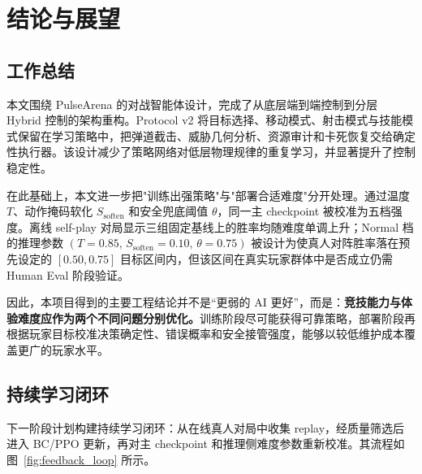 \documentclass[UTF8,a4paper,11pt]{ctexart}
\begin{document}
\section{结论与展望}

\subsection{工作总结}
本文围绕 PulseArena 的对战智能体设计，完成了从底层端到端控制到分层 Hybrid 控制的架构重构。Protocol v2 将目标选择、移动模式、射击模式与技能模式保留在学习策略中，把弹道截击、威胁几何分析、资源审计和卡死恢复交给确定性执行器。该设计减少了策略网络对低层物理规律的重复学习，并显著提升了控制稳定性。

在此基础上，本文进一步把"训练出强策略"与"部署合适难度"分开处理。通过温度 $T$、动作掩码软化 $S_{\mathrm{soften}}$ 和安全兜底阈值 $\theta$，同一主 checkpoint 被校准为五档强度。离线 self-play 对局显示三组固定基线上的胜率均随难度单调上升；Normal 档的推理参数 $(T{=}0.85,\,S_{\mathrm{soften}}{=}0.10,\,\theta{=}0.75)$ 被设计为使真人对阵胜率落在预先设定的 $[0.50,0.75]$ 目标区间内，但该区间在真实玩家群体中是否成立仍需 Human Eval 阶段验证。

因此，本项目得到的主要工程结论并不是“更弱的 AI 更好”，而是：\textbf{竞技能力与体验难度应作为两个不同问题分别优化。}训练阶段尽可能获得可靠策略，部署阶段再根据玩家目标校准决策确定性、错误概率和安全接管强度，能够以较低维护成本覆盖更广的玩家水平。

\subsection{持续学习闭环}
下一阶段计划构建持续学习闭环：从在线真人对局中收集 replay，经质量筛选后进入 BC/PPO 更新，再对主 checkpoint 和推理侧难度参数重新校准。其流程如图~\ref{fig:feedback_loop} 所示。
\end{document}
